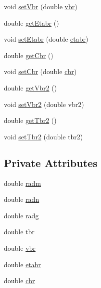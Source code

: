 \begin{DoxyCompactItemize}
\item 
void \hyperlink{classparams_1_1_lat_parm_aaf1c583db5fdaa2c56b0ba680645a005}{set\+Vbr} (double \hyperlink{classparams_1_1_lat_parm_ab4fe89614c538fbc5135ff84699ade62}{vbr})
\item 
double \hyperlink{classparams_1_1_lat_parm_a3129de4a7b41e7e39f0f302c8635ed08}{get\+Etabr} ()
\item 
void \hyperlink{classparams_1_1_lat_parm_a3f86420da4799d6bcd4237527fa716f7}{set\+Etabr} (double \hyperlink{classparams_1_1_lat_parm_a00ff451cea882b0e828a53836433e3ac}{etabr})
\item 
double \hyperlink{classparams_1_1_lat_parm_a63babf6e5b7aaa6cbfc7c2a4297236df}{get\+Cbr} ()
\item 
void \hyperlink{classparams_1_1_lat_parm_a563e6ca04658d03f1fdaaf4a24111433}{set\+Cbr} (double \hyperlink{classparams_1_1_lat_parm_ad93beb21879792881ced00e13af2dc60}{cbr})
\item 
double \hyperlink{classparams_1_1_lat_parm_a03c6d6be6e563232771067e77ce36c83}{get\+Vbr2} ()
\item 
void \hyperlink{classparams_1_1_lat_parm_a005ff41d71ddaec6e5d88bb29f9db65d}{set\+Vbr2} (double vbr2)
\item 
double \hyperlink{classparams_1_1_lat_parm_a9d722976aed615a2652a439d05e9e808}{get\+Tbr2} ()
\item 
void \hyperlink{classparams_1_1_lat_parm_a4822893eea55552bac1de0e7dbefce3a}{set\+Tbr2} (double tbr2)
\end{DoxyCompactItemize}
\subsection*{Private Attributes}
\begin{DoxyCompactItemize}
\item 
double \hyperlink{classparams_1_1_lat_parm_ad4a3a2c6c45ffe5b13b953a639f3771f}{radm}
\item 
double \hyperlink{classparams_1_1_lat_parm_ad3b2a94593c3527d6e5bcb7a4f5008d0}{radn}
\item 
double \hyperlink{classparams_1_1_lat_parm_ac80005b5ba749048ae964321cfe5760d}{radg}
\item 
double \hyperlink{classparams_1_1_lat_parm_a9a38ab3ef2e8fafcf667aa32e714ea33}{tbr}
\item 
double \hyperlink{classparams_1_1_lat_parm_ab4fe89614c538fbc5135ff84699ade62}{vbr}
\item 
double \hyperlink{classparams_1_1_lat_parm_a00ff451cea882b0e828a53836433e3ac}{etabr}
\item 
double \hyperlink{classparams_1_1_lat_parm_ad93beb21879792881ced00e13af2dc60}{cbr}
\end{DoxyCompactItemize}


